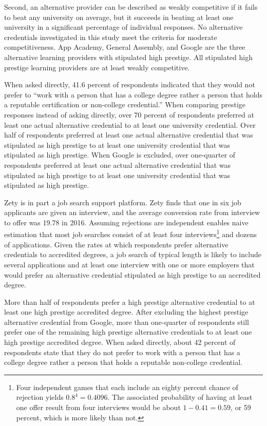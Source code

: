 \documentclass[review]{elsarticle}
\begin{document}
Second, an alternative provider can be described as weakly competitive if it fails to beat any university on average,
but it succeeds in beating at least one university in a significant percentage of individual responses.
No alternative credentials investigated in this study meet the criteria for moderate competitiveness.
App Academy, General Assembly, and Google are the three alternative learning providers with stipulated high prestige.
All stipulated high prestige learning providers are at least weakly competitive.

When asked directly, 41.6 percent of respondents indicated that they would not prefer to
``work with a person that has a college degree rather a person that holds a reputable certification or non-college credential.''
When comparing prestige responses instead of asking directly,
over 70 percent of respondents preferred at least one actual alternative credential to at least one university credential.
Over half of respondents preferred at least one actual alternative credential that was stipulated as high prestige
to at least one university credential that was stipulated as high prestige.
When Google is excluded, over one-quarter of respondents preferred at least one actual alternative credential that was stipulated as high prestige
to at least one university credential that was stipulated as high prestige.

Zety is in part a job search support platform.
Zety finds that one in six job applicants are given an interview,
and the average conversion rate from interview to offer was 19.78 in 2016\cite{turczynski_2021}.
Assuming rejections are independent enables naive estimation that most job searches consist of at least four interviews\footnote{
    Four independent games that each include an eighty percent chance of rejection yields $0.8^4 = 0.4096$.
    The associated probability of having at least one offer result from four interviews would be about $1 - 0.41 = 0.59$,
    or 59 percent, which is more likely than not.
} and dozens of applications.
Given the rates at which respondents prefer alternative credentials to accredited degrees,
a job search of typical length is likely to include several applications and at least one interview
with one or more employers that would prefer an alternative credential stipulated as high prestige to an accredited degree.

More than half of respondents prefer a high prestige alternative credential to at least one high prestige accredited degree.
After excluding the highest prestige alternative credential from Google,
more than one-quarter of respondents still prefer one of the remaining high prestige alternative credentials to at least one high prestige accredited degree.
When asked directly, about 42 percent of respondents state that they do not prefer
to work with a person that has a college degree rather a person that holds a reputable non-college credential.
\end{document}
